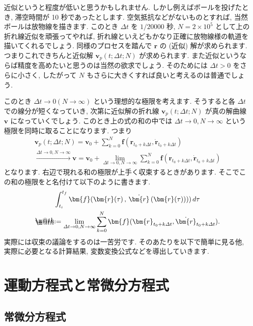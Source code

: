 \documentclass[openany, a4paper, oneside]{book}
\makeatletter
\newcommand*{\defeq}{\mathrel{\rlap{%
\raisebox{0.3ex}{$\m@th\cdot$}}%
\raisebox{-0.3ex}{$\m@th\cdot$}}%
=}
\theoremstyle{break}
\theoremstyle{breakdefn}
\newcommand{\deltat}{\varDelta t}
\makeatother
\begin{document}
近似というと程度が低いと思うかもしれません.
しかし例えばボールを投げたとき, 滞空時間が 10 秒であったとします.
空気抵抗などがないものとすれば, 当然ボールは放物線を描きます.
このとき $\deltat$ を $1/20000$ 秒,  $N=2 \times 10^5$ として上の折れ線近似を頑張ってやれば,
折れ線といえどもかなり正確に放物線様の軌道を描いてくれるでしょう.
同様のプロセスを踏んで $\bm{r}$ の (近似) 解が求められます.
つまりこれできちんと近似解 $\bm{v}_p ( t ; \deltat ;N)$ が求められます.
また近似というならば精度を高めたいと思うのは当然の欲求でしょう.
そのためには $\deltat>0$ をさらに小さく, したがって $N$ もさらに大きくすれば良いと考えるのは普通でしょう.

このとき $\deltat \to 0 ( N \to \infty)$ という理想的な極限を考えます.
そうすると各 $\deltat$ での線分が短くなっていき,
次第に近似解の折れ線 $\bm{v}_p ( t ; \deltat ; N )$ が真の解曲線 $\bm{v}$ になっていくでしょう.
このとき上の式の和の中では $\deltat \to 0 , N \to \infty$ という極限を同時に取ることになります.
つまり
\begin{gather}
\bm{v}_p ( t ; \deltat ; N )
=
\bm{v}_0 + \sum_{k=0}^N \bm{f} ( \bm{r}_{ t_0 + k \deltat } , \dot{ \bm{r} }_{t_0 + k \deltat} )\\
\xrightarrow{\deltat \to 0 , N \to \infty}
\bm{v}
=
\bm{v}_0 + \lim_{ \deltat \to 0 , N \to \infty }
\sum_{k=0}^N \bm{f} ( \bm{r}_{ t_0 + k \deltat } , \dot{ \bm{r} }_{t_0 + k \deltat} )
\end{gather}
となります.
右辺で現れる和の極限が上手く収束するときがあります.
そこでこの和の極限をと名付けて以下のように書きます.
\begin{gather}
\int _{t_i} ^{t_f}
\bm{f} ( \bm{r} (\tau ) \, , \, \dot{ \bm{r} } \, ( \bm{r} (\tau) ) ) ) \, d \tau  \\
\defeq
\lim_{ \deltat \to 0 , N \to \infty }
\sum_{k=0}^N \bm{f} ( \bm{r}_{ t_0 + k \deltat } , \dot{ \bm{r} }_{t_0 + k \deltat} ).
\end{gather}
実際には収束の議論をするのは一苦労です.
そのあたりを以下で簡単に見る他,
実際に必要となる計算結果, 変数変換公式などを導出していきます.
\section{運動方程式と常微分方程式}
\label{sec-5-2-12}
\subsection{常微分方程式}
\label{sec-5-2-12-1}
\end{document}
